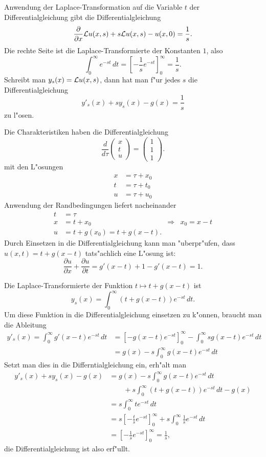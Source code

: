\begin{loesung}
\begin{teilaufgaben}
\item
Anwendung der Laplace-Transformation auf die Variable $t$ der
Differentialgleichung gibt die Differentialgleichung
\[
\frac{\partial}{\partial x}{\cal L}u(x,s)
+s{\cal L}u(x,s)-u(x,0)=\frac1s.
\]
Die rechte Seite ist die Laplace-Transformierte der Konstanten
$1$, also
\[
\int_0^\infty e^{-st}\,dt
=
\left[
-\frac1s e^{-st}
\right]_0^\infty=\frac1s.
\]
Schreibt man $y_s(x)={\cal L}u(x,s)$, dann hat man
f"ur jedes $s$  die Differentialgleichung
\[
y'_s(x)+sy_s(x)-g(x)=\frac1s
\]
zu l"osen.
\item
Die Charakteristiken haben die Differentialgleichung
\[
\frac{d}{d\tau}\begin{pmatrix}
x\\t\\u
\end{pmatrix}
=\begin{pmatrix}
1\\1\\1
\end{pmatrix}.
\]
mit den L"osungen
\begin{align*}
x&=\tau + x_0\\
t&=\tau + t_0\\
u&=\tau + u_0
\end{align*}
Anwendung der Randbedingungen liefert nacheinander
\begin{align*}
t&=\tau\\
x&=t+x_0
&\Rightarrow&x_0=x-t\\
u&=t+g(x_0)=t+g(x-t).
\end{align*}
Durch Einsetzen in die Differentialgleichung kann man "uberpr"ufen,
dass $u(x,t)=t+g(x-t)$ tats"achlich eine L"osung ist:
\[
\frac{\partial u}{\partial x}+\frac{\partial u}{\partial t}
=
g'(x-t)+1-g'(x-t)=1.
\]
\item
Die Laplace-Transformierte der Funktion $t\mapsto t+g(x-t)$ ist
\[
y_s(x)=\int_0^\infty (t+g(x-t))e^{-st}\,dt.
\]
Um diese Funktion in die Differentialgleichung einsetzen zu k"onnen,
braucht man die Ableitung
\begin{align*}
y'_s(x)=\int_0^\infty g'(x-t)e^{-st}\,dt
&=\left[-g(x-t)e^{-st}\right]_0^\infty
-\int_0^\infty sg(x-t)e^{-st}\,dt
\\
&=g(x)-s\int_0^\infty g(x-t) e^{-st}\,dt
\end{align*}
Setzt man dies in die Differntialgleichung ein, erh"alt man
\begin{align*}
y'_s(x)+sy_s(x)-g(x)&=g(x)-s\int_0^\infty g(x-t)e^{-st}\,dt
\\
&\qquad
+s\int_0^\infty (t+g(x-t)) e^{-st}\,dt-g(x)
\\
&=s\int_0^\infty te^{-st}\,dt
\\
&=s\left[-\frac{t}{s}e^{-st}\right]_0^\infty
+s\int_0^\infty\frac{1}{s}e^{-st}\,dt
\\
&=\left[-\frac1s e^{-st}\right]_0^\infty
=\frac1s,
\end{align*}
die Differentialgleichung ist also erf"ullt.
\qedhere
\end{teilaufgaben}
\end{loesung}
